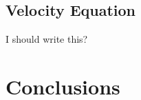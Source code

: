 \documentclass{article}
\begin{document}
\subsection{Velocity Equation}
I should write this?

\section{Conclusions}

\nocite{*}


\end{document}
